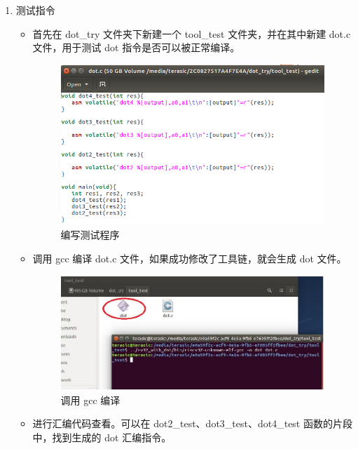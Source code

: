 \documentclass[a4paper, 14pt, oneside]{book} %
\numberwithin{equation}{subsection}
\begin{document}
\begin{enumerate}
			\item 测试指令
				\begin{itemize}
					\item 首先在 dot\_try 文件夹下新建一个 tool\_test
					文件夹，并在其中新建 dot.c 文件，用于测试 dot 指令是否可以被正常编译。
						\begin{figure}[H]
							\centering  
							\includegraphics[scale=0.6]{img/6.png} 
							\caption{编写测试程序}
						\end{figure}
					\item 调用 gcc 编译 dot.c 文件，如果成功修改了工具链，就会生成 dot 文件。
						\begin{figure}[H]
							\centering  
							\includegraphics[scale=0.8]{img/makedot.JPG} 
							\caption{调用 gcc 编译}
						\end{figure}
					\item 进行汇编代码查看。可以在 dot2\_test、dot3\_test、dot4\_test 函数的片段中，找到生成的 dot 汇编指令。
						\begin{figure}[H]
							\centering  

\end{figure}
\end{itemize}
\end{enumerate}
\end{document}
